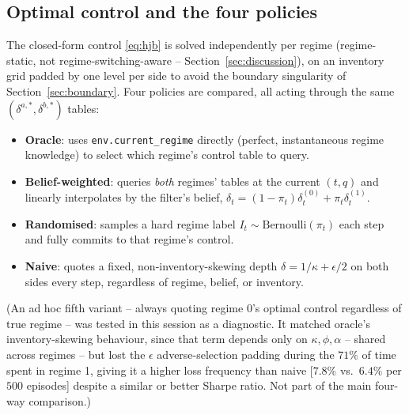\documentclass[11pt]{article}
\begin{document}
\subsection{Optimal control and the four policies}
The closed-form control \eqref{eq:hjb} is solved independently per regime (regime-static, not regime-switching-aware -- Section~\ref{sec:discussion}), on an inventory grid padded by one level per side to avoid the boundary singularity of Section~\ref{sec:boundary}. Four policies are compared, all acting through the same $(\delta^{a,*},\delta^{b,*})$ tables:
\begin{itemize}
\item \textbf{Oracle}: uses \texttt{env.current\_regime} directly (perfect, instantaneous regime knowledge) to select which regime's control table to query.
\item \textbf{Belief-weighted}: queries \emph{both} regimes' tables at the current $(t,q)$ and linearly interpolates by the filter's belief, $\delta_t = (1-\pi_t)\delta^{(0)}_t + \pi_t\delta^{(1)}_t$.
\item \textbf{Randomised}: samples a hard regime label $I_t\sim\mathrm{Bernoulli}(\pi_t)$ each step and fully commits to that regime's control.
\item \textbf{Naive}: quotes a fixed, non-inventory-skewing depth $\delta = 1/\kappa + \epsilon/2$ on both sides every step, regardless of regime, belief, or inventory.
\end{itemize}
(An ad hoc fifth variant -- always quoting regime 0's optimal control regardless of true regime -- was tested in this session as a diagnostic. It matched oracle's inventory-skewing behaviour, since that term depends only on $\kappa,\phi,\alpha$ -- shared across regimes -- but lost the $\epsilon$ adverse-selection padding during the $71\%$ of time spent in regime 1, giving it a higher loss frequency than naive [$7.8\%$ vs.\ $6.4\%$ per $500$ episodes] despite a similar or better Sharpe ratio. Not part of the main four-way comparison.)
\end{document}
